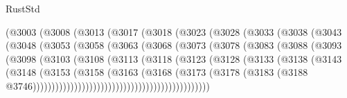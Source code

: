 \begin{lexlean}{RustStd}
\begin{coremodule}
{\begin{coremodule}
{{{{{{{{{{{{{{{{{{{{{{{{{{{{{{{{{{{{{{{{{{{{{{{{{{{{{{{{{{{{{{{{{{{{{{{{{{{{{{{{                    (@3003
                      (@3008
                        (@3013
                          (@3017
                            (@3018
                              (@3023
                                (@3028
                                  (@3033
                                    (@3038
                                      (@3043
                                        (@3048
                                          (@3053
                                            (@3058
                                              (@3063
                                                (@3068
                                                  (@3073
                                                    (@3078
                                                      (@3083
                                                        (@3088
                                                          (@3093
                                                            (@3098
                                                              (@3103
                                                                (@3108
                                                                  (@3113
                                                                    (@3118
                                                                      (@3123
                                                                        (@3128
                                                                          (@3133
                                                                            (@3138
                                                                              (@3143
                                                                                (@3148
                                                                                  (@3153
                                                                                    (@3158
                                                                                      (@3163
                                                                                        (@3168
                                                                                          (@3173
                                                                                            (@3178
                                                                                              (@3183
                                                                                                (@3188
                                                                                                  @3746)))))))))))))))))))))))))))))))))))))))))))))))
}}}}}}}}}}}}}}}}}}}}}}}}}}}}}}}}}}}}}}}}}}}}}}}}}}}}}}}}}}}}}}}}}}}}}}}}}}}}}}}}
\end{coremodule}}
\end{coremodule}
\end{lexlean}
